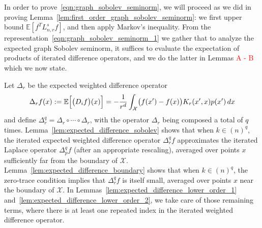 \documentclass{article}
\newcommand{\1}{\mathbf{1}}
\newcommand{\Lap}{L}
\newcommand{\Xset}{\mathcal{X}}
\newcommand{\Ebb}{\mathbb{E}}
\theoremstyle{alden}
\theoremstyle{aldenthm}
\theoremstyle{definition}
\theoremstyle{remark}
\begin{document}
In order to prove~\eqref{eqn:graph_sobolev_seminorm}, we will proceed as we did in proving Lemma~\ref{lem:first_order_graph_sobolev_seminorm}: we first upper bound $\Ebb[f^T \Lap_{n,r}^s f]$, and then apply Markov's inequality. From the representation~\eqref{eqn:graph_sobolev_seminorm_1} we gather that to analyze the expected graph Sobolev seminorm, it suffices to evaluate the expectation of products of iterated difference operators, and we do the latter in Lemmas \textcolor{red}{A - B} which we now state.

Let $\Delta_r$ be the expected weighted difference operator
\begin{equation}
\Delta_rf(x) := \Ebb\Bigl[\bigl(D_if\bigr)(x)\Bigr] = -\frac{1}{r^d}\int_{\Xset} \bigl(f(x') - f(x)\bigr) K_r(x',x) p(x') \,dx
\end{equation}
and define $\Delta_r^q = \Delta_r \circ \cdots \circ \Delta_r$, with the operator $\Delta_r$ being composed a total of $q$ times. Lemma~\ref{lem:expected_difference_sobolev} shows that when $k \in (n)^q$, the iterated expected weighted difference operator $\Delta_r^qf$ approximates the iterated Laplace operator $\Delta_p^qf$ (after an appropriate rescaling), averaged over points $x$ sufficiently far from the boundary of $\Xset$. Lemma~\ref{lem:expected_difference_boundary} shows that when $k \in (n)^q$, the zero-trace condition implies that $\Delta_r^qf$ is itself small, averaged over points $x$ near the boundary of $\Xset$. In Lemmas~\ref{lem:expected_difference_lower_order_1} and~\ref{lem:expected_difference_lower_order_2}, we take care of those remaining terms, where there is at least one repeated index in the iterated weighted difference operator.
\end{document}
